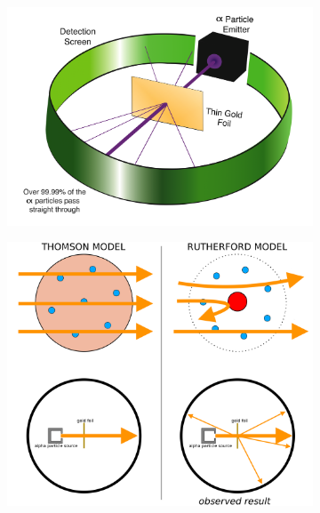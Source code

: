 \documentclass[12pt]{report}
\begin{document}
\begin{figure}[ht]
	\centering
	\begin{subfigure}{0.5\textwidth}
		\centering
		\includegraphics[width=\linewidth]{gold-foil-experiment.png}
	\end{subfigure}%
	\begin{subfigure}{.5\textwidth}
		\centering
			{\includegraphics[width=\linewidth]{assets/atom-model-comparison-answer.png}}

\end{subfigure}
\end{figure}
\end{document}
